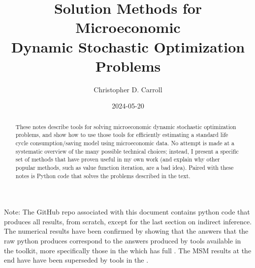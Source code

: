 \documentclass[titlepage, headings=optiontotocandhead]{econtex}
\begin{document}


\title{Solution Methods for Microeconomic \\ Dynamic Stochastic Optimization Problems}

\author{Christopher D. Carroll\authNum}


\date{2024-05-20}
\maketitle
\footnotesize


\noindent  Note: The GitHub repo {\SMDSOPrepo} associated with this document contains python code that produces all results, from scratch, except for the last section on indirect inference.  The numerical results have been confirmed by showing that the answers that the raw python produces correspond to the answers produced by tools available in the {\ARKurl} toolkit, more specifically those in the {\HARKrepo} which has full {\HARKdocs}.  The MSM results at the end have have been superseded by tools in the {\EMDSOPrepo}.

\normalsize

\hypertarget{abstract}{}
\begin{abstract}
  These notes describe tools for solving microeconomic dynamic stochastic optimization problems, and show how to use those tools for efficiently estimating a standard life cycle consumption/saving model using microeconomic data.  No attempt is made at a systematic overview of the many possible technical choices; instead, I present a specific set of methods that have proven useful in my own work (and explain why other popular methods, such as value function iteration, are a bad idea).  Paired with these notes is Python code that solves the problems described in the text.
\end{abstract}
\end{document}
